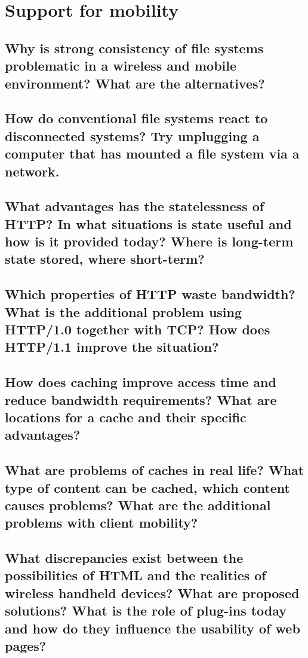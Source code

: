\section{Support for mobility}

\subsection{Why is strong consistency of file systems problematic in a wireless and mobile
environment? What are the alternatives?}

\subsection{How do conventional file systems react to disconnected systems? Try unplugging a
computer that has mounted a file system via a network.}

\subsection{What advantages has the statelessness of HTTP? In what situations is state useful
and how is it provided today? Where is long-term state stored, where short-term?}

\subsection{Which properties of HTTP waste bandwidth? What is the additional problem using
HTTP/1.0 together with TCP? How does HTTP/1.1 improve the situation?}

\subsection{How does caching improve access time and reduce bandwidth requirements? What
are locations for a cache and their specific advantages?}

\subsection{What are problems of caches in real life? What type of content can be cached, which
content causes problems? What are the additional problems with client mobility?}

\subsection{What discrepancies exist between the possibilities of HTML and the realities of
wireless handheld devices? What are proposed solutions? What is the role of plug-ins
today and how do they influence the usability of web pages?}

